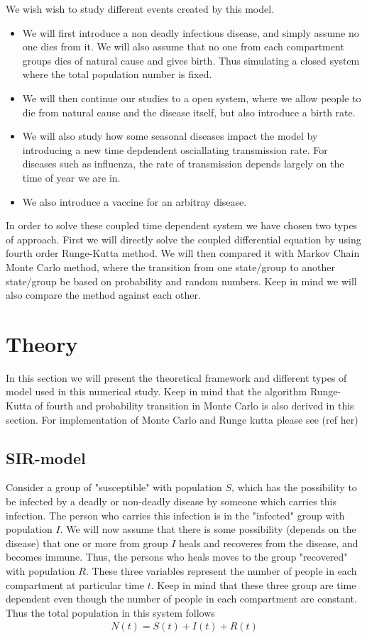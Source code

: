 \documentclass[a4paper, 10pt]{article}
\begin{document}
We wish wish to study different events created by this model.
\begin{itemize}
  \item We will first introduce a
  non deadly infectious disease, and simply assume no one dies from it. We will also
  assume that no one from each compartment groups dies of natural cause and gives birth.
  Thus simulating a closed system where the total population number is fixed.
  \item We will then continue our studies to a open system, where we allow people
  to die from natural cause and the disease itself, but also introduce a birth rate.
  \item We will also study how some seasonal diseases impact the model by
  introducing a new time depdendent osciallating transmission rate. For diseases
  such as influenza, the rate of transmission depends largely on the time of year we are in.
  \item We also introduce a vaccine for an arbitray disease.
\end{itemize}
In order to solve these coupled time dependent system we have chosen two types of approach.
First we will  directly solve the coupled differential equation by using fourth order
Runge-Kutta method. We will then compared it with Markov Chain
Monte Carlo method, where the transition from one state/group to another state/group
be based on probability and random numbers. Keep in mind we will also compare
the method against each other.

\section{Theory}
In this section we will present the theoretical framework and different types of model used in this
numerical study. Keep in mind that the algorithm Runge-Kutta of fourth and probability transition in Monte Carlo
is also derived in this section. For implementation of Monte Carlo and Runge kutta please see (ref her)

\subsection{SIR-model}\label{SIR model}
Consider a group of "susceptible" with population $S$, which has the possibility to be infected by a deadly or non-deadly
disease by someone which carries this infection. The person who carries this infection is in the "infected" group with population $I$.
We will now assume that there is some possibility (depends on the disease) that one or more from group $I$
heals and recoveres from the disease, and becomes immune. Thus, the persons who heals moves to the group "recovered" with population $R$.
These three variables represent the number of people in each compartment at particular time $t$. Keep in mind
that these three group are time dependent even though the number of people in each
compartment are constant. Thus the total population in this system follows
\begin{align}
  N(t) = S(t) + I(t) + R(t)
\end{align}
\end{document}
